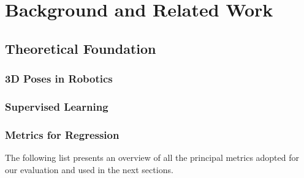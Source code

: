 \chapter{Background and Related Work}
\label{chap:theory}

\glsresetall




\section{Theoretical Foundation}

\subsection{3D Poses in Robotics}
\label{subsec:robot-pose}


\subsection{Supervised Learning}
\label{subsec:supervised-learning}


\subsection{Metrics for Regression}
\label{subsec:metrics}

The following list presents an overview of all the principal metrics adopted for our evaluation and used in the next sections.

